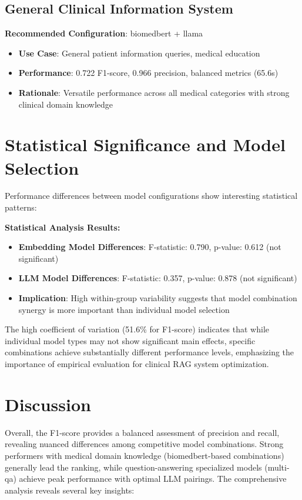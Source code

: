 \subsection{General Clinical Information System}
\textbf{Recommended Configuration}: biomedbert + llama
\begin{itemize}
    \item \textbf{Use Case}: General patient information queries, medical education
    \item \textbf{Performance}: 0.722 F1-score, 0.966 precision, balanced metrics (65.6s)
    \item \textbf{Rationale}: Versatile performance across all medical categories with strong clinical domain knowledge
\end{itemize}

\section{Statistical Significance and Model Selection}

 \newline Performance differences between model configurations show interesting statistical patterns:

\textbf{Statistical Analysis Results:}
\begin{itemize}
    \item \textbf{Embedding Model Differences}: F-statistic: 0.790, p-value: 0.612 (not significant)
    \item \textbf{LLM Model Differences}: F-statistic: 0.357, p-value: 0.878 (not significant)
    \item \textbf{Implication}: High within-group variability suggests that model combination synergy is more important than individual model selection
\end{itemize}

The high coefficient of variation (51.6\% for F1-score) indicates that while individual model types may not show significant main effects, specific combinations achieve substantially different performance levels, emphasizing the importance of empirical evaluation for clinical RAG system optimization.

\section{Discussion}
Overall, the F1-score provides a balanced assessment of precision and recall, revealing nuanced differences among competitive model combinations. Strong performers with medical domain knowledge (biomedbert-based combinations) generally lead the ranking, while question-answering specialized models (multi-qa) achieve peak performance with optimal LLM pairings. The comprehensive analysis reveals several key insights:

